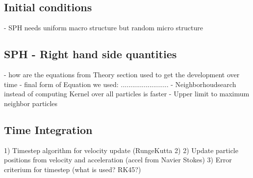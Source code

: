 \subsection{Initial conditions}
- SPH needs uniform macro structure but random micro structure


\subsection{SPH - Right hand side quantities}
- how are the equations from Theory section used to get the development over time
- final form of Equation we used:
.........................
- Neighborhoudsearch instead of computing Kernel over all particles is faster
- Upper limit to maximum neighbor particles


\subsection{Time Integration}
1) Timestep algorithm for velocity update (RungeKutta 2)
2) Update particle positions from velocity and acceleration (accel from Navier Stokes)
3) Error criterium for timestep (what is used? RK45?)

